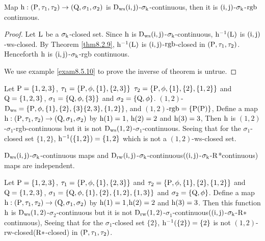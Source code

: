 \begin{thm}\label{thm8.5.10}
Map $\mathrm{h}:(\mathrm{P}, \tau_1, \tau_2 )\to (\mathrm{Q}, \sigma_{1}, \sigma_{2} )$ is $\mathrm{D}_{\mathrm{ws}} (\mathrm{i}, \mathrm{j})$-$\sigma_{\mathrm{k}}$-continuous, then it is $(\mathrm{i}, \mathrm{j})$-$\sigma_{\mathrm{k}}$-$\mathrm{rgb}$ continuous.
\end{thm}

\begin{proof}
Let $\mathrm{L}$ be a $\sigma_{\mathrm{k}}$-closed set. Since $\mathrm{h}$ is $\mathrm{D}_{\mathrm{ws}} (\mathrm{i}, \mathrm{j})$-$\sigma_{\mathrm{k}}$-continuous, $\mathrm{h}^{-1} (\mathrm{L})$ is $(\mathrm{i}, \mathrm{j})$-ws-closed. By Theorem \ref{thm8.2.9}, $\mathrm{h}^{-1} (\mathrm{L})$ is $(\mathrm{i}, \mathrm{j})$-$\mathrm{rgb}$-closed in $(\mathrm{P}, \tau_1, \tau_2 )$. Henceforth $\mathrm{h}$ is $(\mathrm{i}, \mathrm{j})$-$\sigma_{\mathrm{k}}$-rgb continuous.

We use example \ref{exam8.5.10} to prove the inverse of theorem is untrue.
\end{proof}

\begin{exm}\label{exam8.5.10}
Let $\mathrm{P}=\{1,2,3\}$, $\tau_1 =\{\mathrm{P}, \phi, \{1\}, \{2,3\}\}$ $\tau_2 =\{\TSP, \phi, \{1\},\{2\},\break \{1,2\}\}$ and $\mathrm{Q}=\{1,2,3\}$, $\sigma_{1} =\{\mathrm{Q}, \phi, \{3\}\}$ and $\sigma_{2} =\{\mathrm{Q}, \phi\}$. $(1,2)$-$\clrD_{\ws} =\{\TSP, \phi, \{1\},\break \{2\},\{3\}\{2,3\},\{1,2\}\}$, and $(1,2)$-$\mathrm{rgb} =\{\mathrm{P}(\mathrm{P})\}$, Define a map $\mathrm{h}:(\mathrm{P}, \tau_1, \tau_2 )\to (\mathrm{Q}, \sigma_{1}, \sigma_{2} )$ by $\mathrm{h}(1)=1$, $\mathrm{h}(2)=2$ and $\mathrm{h}(3)=3$, Then $\mathrm{h}$ is $(1, 2)$-$\sigma_{1}$-rgb-continuous but it is not $\mathrm{D}_{\mathrm{ws}} (1, 2)$-$\sigma_{1}$-continuous. Seeing that for the $\sigma_{1}$-closed set $\{1,2\}$, $\mathrm{h}^{-1} (\{1,2\})=\{1,2\}$ which is not a $(1, 2)$-ws-closed set.
\end{exm}

\begin{rem}\label{rem8.5.2}
$\mathrm{D}_{\mathrm{ws}} (\mathrm{i}, \mathrm{j})$-$\sigma_{\mathrm{k}}$-continuous maps and $\mathrm{D}_{\mathrm{rw}} (\mathrm{i}, \mathrm{j})$-$\sigma_{\mathrm{k}}$-continuous$((\mathrm{i}, \mathrm{j})$-$\sigma_{\mathrm{k}}$-{\break}$\mathrm{R}$*continuous) maps are independent.
\end{rem}

\begin{exm}\label{exam8.5.11}
Let $\mathrm{P}=\{1,2,3\}$, $\tau_1 =\{\mathrm{P}, \phi, \{1\}, \{2,3\}\}$ and $\tau_2 =\{\TSP, \phi, \{1\},\{2\},\break \{1,2\}\}$ and $\mathrm{Q}=\{1,2,3\}$, $\sigma_{1} =\{\mathrm{Q}, \phi,\{1\},\{2\},\{1,2\},\{1,3\}\}$ and $\sigma_{2} =\{\mathrm{Q}, \phi\}$. Define a map $\mathrm{h}:(\mathrm{P}, \tau_1, \tau_2 )\to (\mathrm{Q}, \sigma_{1},\sigma_{2} )$ by $\mathrm{h}(1)=1$,$\mathrm{h}(2)=2$ and $\mathrm{h}(3)=3$. Then this function $\mathrm{h}$ is $\mathrm{D}_{\mathrm{ws}} (1, 2)$-$\sigma_{2}$-continuous but it is not $\mathrm{D}_{\mathrm{rw}}(1, 2)$-$\sigma_{1}$-continuous$((\mathrm{i}, \mathrm{j})$-$\sigma_{\mathrm{k}}$-$\mathrm{R}*$continuous), Seeing that for the $\sigma_{1}$-closed set $\{2\}$, $\mathrm{h}^{-1} (\{2\})=\{2\}$ is not $(1, 2)$-rw-closed($\mathrm{R}*$-closed) in $(\mathrm{P}, \tau_1, \tau_2 )$. 
\end{exm}

